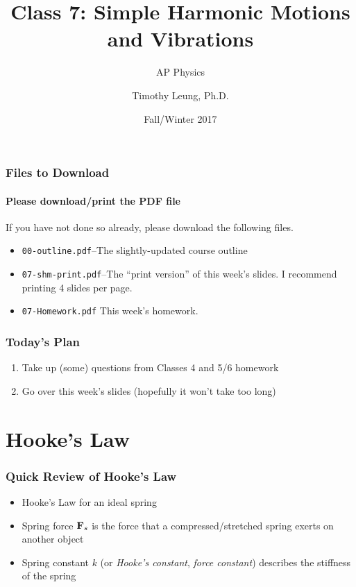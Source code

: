 \documentclass[12pt,compress,aspectratio=169]{beamer}
\title{Class 7: Simple Harmonic Motions and Vibrations}
\subtitle{AP Physics}
\author[TML]{Timothy Leung, Ph.D.}
\institute{Olympiads School}
\date{Fall/Winter 2017}
\newcommand{\mb}[1]{\ensuremath\mathbf{#1}}
\begin{document}
\begin{frame}
  \maketitle
\end{frame}

\begin{frame}
  \frametitle{Files to Download}
  \framesubtitle{Please download/print the PDF file}
  If you have not done so already, please download the following files.
  \begin{itemize}
  \item\texttt{00-outline.pdf}--The slightly-updated course outline
  \item\texttt{07-shm-print.pdf}--The ``print version'' of this week's
    slides. I recommend printing 4 slides per page.
  \item\texttt{07-Homework.pdf} This week's homework.
  \end{itemize}
\end{frame}


\begin{frame}
  \frametitle{Today's Plan}
  \begin{enumerate}
  \item Take up (some) questions from Classes 4 and 5/6 homework
  \item Go over this week's slides (hopefully it won't take too long)
  \end{enumerate}
\end{frame}


\section{Hooke's Law}
\begin{frame}
  \frametitle{Quick Review of Hooke's Law}
  \begin{itemize}
  \item Hooke's Law for an ideal spring

    \vspace{-.2in}{\Large
      \begin{displaymath}
        \boxed{\mb{F}_s=-k\mb{x}}
      \end{displaymath}
    }
  \item Spring force $\mb{F}_s$ is the force that a compressed/stretched
    spring exerts on another object
  \item Spring constant $k$ (or \emph{Hooke's constant},
    \emph{force constant}) describes the stiffness of the spring
  \end{itemize}
\end{frame}
\end{document}
